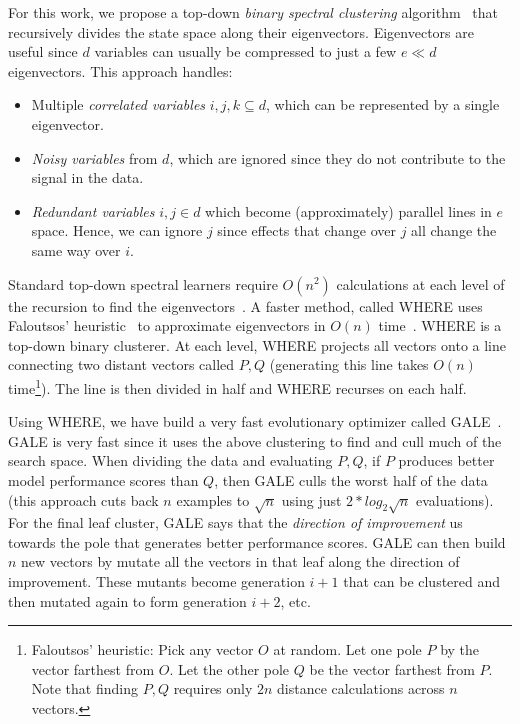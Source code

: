 \documentclass[12pt]{article}
\newcommand{\bi}{\begin{itemize}[leftmargin=0.5cm]}
\newcommand{\ei}{\end{itemize}}
\begin{document}
 
For this work, we propose a top-down  {\em binary spectral clustering} algorithm~\cite{kamvar03} 
that recursively divides
the state space along their eigenvectors. Eigenvectors are useful since 
  $d$ variables can usually be compressed to just
  a few $e \ll d$ eigenvectors. This approach handles:
\bi
\item
Multiple {\em correlated variables} $i,j,k \subseteq d$, which can be represented
by a single  eigenvector.
\item
{\em Noisy variables} from $d$, which are 
ignored since they  do not contribute to the signal in the data.
\item
{\em Redundant  variables} \mbox{$i,j \in d$} which become (approximately) parallel lines
in $e$ space. Hence, we 
can ignore $j$ 
since effects that change over $j$ all
change   the same way over $i$.
\ei
Standard top-down spectral learners require  $O(n^2)$ calculations at each level 
of the recursion to find the eigenvectors~\cite{boley98}. A faster method, called WHERE 
uses Faloutsos'  heuristic~\cite{Faloutsos1995} to
approximate eigenvectors   in $O(n)$ time~\cite{platt05}.
WHERE  is a top-down binary clusterer.  
At each level, WHERE  projects all  vectors onto a line connecting two distant vectors called $P,Q$ (generating this line takes $O(n)$ time\footnote{Faloutsos’ heuristic: Pick any vector $O$ at random. Let one pole $P$ by the
vector farthest from $O$. Let the other pole $Q$ be the vector farthest from $P$. Note that
finding $P,Q$ requires only $2n$ distance calculations across $n$ vectors.}).
The line is then divided in half
and WHERE recurses on each half. 

Using WHERE, we have build a very fast     evolutionary optimizer
called GALE~\cite{krall2015gale}. 
GALE is very fast since it uses the above clustering to find and cull much of the 
search space.
When dividing the data and 
evaluating   $P,Q$, if $P$ produces better model performance scores than $Q$, then
GALE  culls   the worst half of the data (this approach cuts back $n$ examples to $\sqrt{n}$ using
just $2*log_2{\sqrt{n}}$ evaluations). 
For the final leaf cluster, GALE says that the {\em direction of improvement} us
towards the pole
that generates better performance scores. GALE can then build $n$ new vectors by mutate
all the vectors in that leaf along the direction of improvement. 
These mutants become
generation $i+1$ that can be clustered  and then mutated again to form
generation $i+2$, etc.
\end{document}
